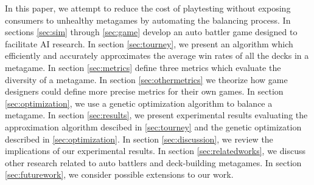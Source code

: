 
In this paper, we attempt to reduce the cost of playtesting without
exposing consumers to unhealthy metagames by automating the balancing
process. In sections \ref{sec:sim} through \ref{sec:game} develop an auto battler game designed to facilitate AI research. In
section \ref{sec:tourney}, we present an algorithm which efficiently
and accurately approximates the average win rates of all the decks in
a metagame. In section \ref{sec:metrics} define three metrics which
evaluate the diversity of a metagame. In section
\ref{sec:othermetrics} we theorize how game designers could define
more precise metrics for their own games. In section
\ref{sec:optimization}, we use a genetic optimization algorithm to
balance a metagame. In section \ref{sec:results}, we present
experimental results evaluating the approximation algorithm descibed
in \ref{sec:tourney} and the genetic optimization described in
\ref{sec:optimization}. In section \ref{sec:discussion}, we review the
implications of our experimental results. In section
\ref{sec:relatedworks}, we discuss other research related to auto
battlers and deck-building metagames. In section \ref{sec:futurework},
we consider possible extensions to our work.






